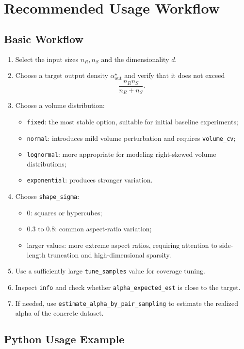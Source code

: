 \documentclass[11pt,a4paper]{article}
\newcommand{\code}[1]{\texttt{#1}}
\begin{document}
\section{Recommended Usage Workflow}

\subsection{Basic Workflow}

\begin{enumerate}
  \item Select the input sizes $n_R,n_S$ and the dimensionality $d$.
  \item Choose a target output density $\alpha_{\mathrm{out}}^\star$ and verify that it does not exceed
  \[
    \frac{n_Rn_S}{n_R+n_S}.
  \]
  \item Choose a volume distribution:
  \begin{itemize}
    \item \code{fixed}: the most stable option, suitable for initial baseline experiments;
    \item \code{normal}: introduces mild volume perturbation and requires \code{volume\_cv};
    \item \code{lognormal}: more appropriate for modeling right-skewed volume distributions;
    \item \code{exponential}: produces stronger variation.
  \end{itemize}
  \item Choose \code{shape\_sigma}:
  \begin{itemize}
    \item $0$: squares or hypercubes;
    \item $0.3$ to $0.8$: common aspect-ratio variation;
    \item larger values: more extreme aspect ratios, requiring attention to side-length truncation and high-dimensional sparsity.
  \end{itemize}
  \item Use a sufficiently large \code{tune\_samples} value for coverage tuning.
  \item Inspect \code{info} and check whether \code{alpha\_expected\_est} is close to the target.
  \item If needed, use \code{estimate\_alpha\_by\_pair\_sampling} to estimate the realized alpha of the concrete dataset.
\end{enumerate}

\subsection{Python Usage Example}
\end{document}

